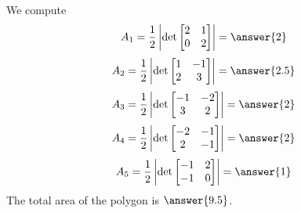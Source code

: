 \documentclass{ximera}
\begin{document}
\begin{example}
\begin{explanation}
\begin{center}
      \end{center}
      We compute
      $$A_1=\frac{1}{2}\left|\det\begin{bmatrix}2 & 1\\0 & 2\end{bmatrix}\right |=\answer{2}$$
      $$A_2=\frac{1}{2}\left|\det\begin{bmatrix}1 & -1\\2 & 3\end{bmatrix}\right |=\answer{2.5}$$
      $$A_3=\frac{1}{2}\left|\det\begin{bmatrix}-1 & -2\\3 & 2\end{bmatrix}\right |=\answer{2}$$
      $$A_4=\frac{1}{2}\left|\det\begin{bmatrix}-2 & -1\\2 & -1\end{bmatrix}\right |=\answer{2}$$
      $$A_5=\frac{1}{2}\left|\det\begin{bmatrix}-1 & 2\\-1 & 0\end{bmatrix}\right |=\answer{1}$$
      The total area of the polygon is $\answer{9.5}$.
      \end{explanation}
      \end{example}

  
\end{document}
